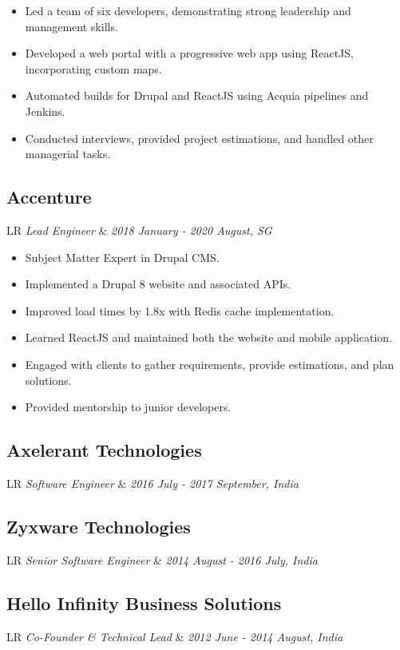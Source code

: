 \documentclass[11pt,a4paper]{moderncv}
\newcommand*{\experienceentry}[5][1.5mm]{
    \subsection{#2} \vspace{-1.5mm}
    \begin{tabularx}{\textwidth}{LR}
        {\itshape #3} & {\itshape #4, #5}
    \end{tabularx}
    \par\addvspace{#1}
}
\begin{document}
\begin{minipage}[t]{0.62\textwidth}
\begin{itemize}
    \item Led a team of six developers, demonstrating strong leadership and management skills.
    \item Developed a web portal with a progressive web app using ReactJS, incorporating custom maps.
    \item Automated builds for Drupal and ReactJS using Acquia pipelines and Jenkins.
    \item Conducted interviews, provided project estimations, and handled other managerial tasks.
\end{itemize}

\experienceentry{Accenture}{Lead Engineer}{2018 January - 2020 August}{SG}
\begin{itemize}
    \item Subject Matter Expert in Drupal CMS.
    \item Implemented a Drupal 8 website and associated APIs.
    \item Improved load times by 1.8x with Redis cache implementation.
    \item Learned ReactJS and maintained both the website and mobile application.
    \item Engaged with clients to gather requirements, provide estimations, and plan solutions.
    \item Provided mentorship to junior developers.
\end{itemize}
\experienceentry{Axelerant Technologies}{Software Engineer}{2016 July - 2017 September}{India}
\experienceentry{Zyxware Technologies}{Senior Software Engineer}{2014 August - 2016 July}{India}
\experienceentry{Hello Infinity Business Solutions}{Co-Founder \& Technical Lead}{2012 June - 2014 August}{India}

\end{minipage}
\hfill
\end{document}
